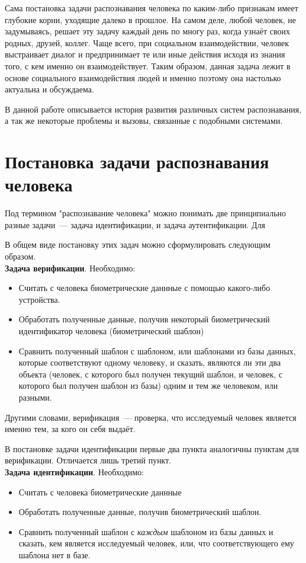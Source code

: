 \documentclass[14pt, a4paper]{extarticle}
\begin{document}
Сама постановка задачи распознавания человека по каким-либо признакам имеет глубокие корни, уходящие далеко в прошлое. На самом деле, любой человек, не задумываясь, решает эту задачу каждый день по многу раз, когда узнаёт своих родных, друзей, коллег. Чаще всего, при социальном взаимодействии, человек выстраивает диалог и предпринимает те или иные действия исходя из знания того, с кем именно он взаимодействует. Таким образом, данная задача лежит в основе социального взаимодействия людей и именно поэтому она настолько актуальна и обсуждаема.

В данной работе описывается история развития различных систем распознавания, а так же некоторые проблемы и вызовы, связанные с подобными системами.

\newpage
\section{Постановка задачи распознавания человека}
Под термином "распознавание человека" можно понимать две принципиально разные задачи~--- задача идентификации, и задача аутентификации. Для 


В общем виде постановку этих задач можно сформулировать следующим образом. \\
\textbf{Задача верификации}. Необходимо:
\begin{itemize}
	\item Считать с человека биометрические даннные с помощью какого-либо устройства.
	\item Обработать полученные данные, получив некоторый биометрический идентификатор человека (биометрический шаблон)
	\item Сравнить полученный шаблон с шаблоном, или шаблонами из базы данных, которые соответствуют одному человеку, и сказать, являются ли эти два объекта (человек, с которого был получен текущий шаблон, и человек, с которого был получен шаблон из базы) одним и тем же человеком, или разными.
\end{itemize}

Другими словами, верификация~--- проверка, что исследуемый человек является именно тем, за кого он себя выдаёт.

В постановке задачи идентификации первые два пункта аналогичны пунктам для верификации. Отличается лишь третий пункт.\\
\textbf{Задача идентификации}. Необходимо:
\begin{itemize}
	\item Считать с человека биометрические даннные
	\item Обработать полученные данные, получив биометрический шаблон.
	\item Сравнить полученный шаблон с \textit{каждым} шаблоном из базы данных и сказать, кем является исследуемый человек, или, что соответствующего ему шаблона нет в базе.
\end{itemize}
\end{document}
